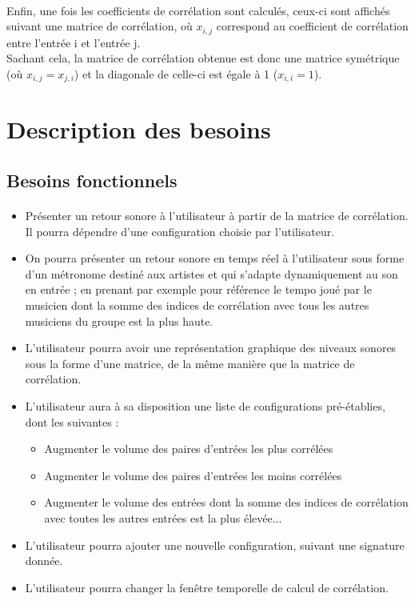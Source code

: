 \documentclass{article}
\begin{document}
    \paragraph{}
    Enfin, une fois les coefficients de corrélation sont calculés, ceux-ci sont
    affichés suivant une matrice de corrélation, où $x_{i,j}$ correspond au
    coefficient de corrélation entre l'entrée i et l'entrée j.\\
    Sachant cela, la matrice de corrélation obtenue est donc une matrice
    symétrique (où $x_{i,j} = x_{j,i}$) et la diagonale de celle-ci est égale à
    1 ($x_{i,i} = 1$).
  \section{Description des besoins}
    \subsection{Besoins fonctionnels}
    \paragraph{}
    \begin{itemize}
      \item Présenter un retour sonore à l'utilisateur à partir de la matrice de
      corrélation. Il pourra dépendre d'une configuration choisie par l'utilisateur.
      \item On pourra présenter un retour sonore en temps réel à l'utilisateur sous
      forme d'un métronome destiné aux artistes et qui s'adapte dynamiquement au son
      en entrée ; en prenant par exemple pour référence le tempo joué par le musicien
      dont la somme des indices de corrélation avec tous les autres musiciens du groupe
      est la plus haute.
      \item L'utilisateur pourra avoir une représentation graphique des niveaux
      sonores sous la forme d'une matrice, de la même manière que la matrice de
      corrélation.
      \item L'utilisateur aura à sa disposition une liste de configurations
      pré-établies, dont les suivantes :
      \begin{itemize}
        \item Augmenter le volume des paires d'entrées les plus corrélées
        \item Augmenter le volume des paires d'entrées les moins corrélées
        \item Augmenter le volume des entrées dont la somme des indices de
        corrélation avec toutes les autres entrées est la plus élevée...
      \end{itemize}
      \item L'utilisateur pourra ajouter une nouvelle configuration, suivant
      une signature donnée.
      \item L'utilisateur pourra changer la fenêtre temporelle de calcul de
      corrélation.
    \end{itemize}
\end{document}

